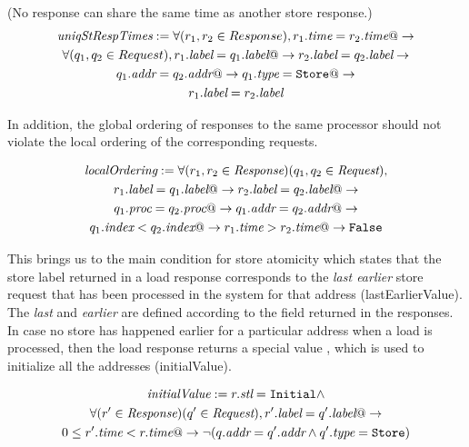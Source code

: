 \begin{defn} (No response can share the same time as another store response.)
\begin{multline*}
\textit{uniqStRespTimes} := 
\forall (r_1, r_2 \in Response), r_1.\textit{time} = r_2.\textit{time} @-> \\
\forall (q_1, q_2 \in Request), r_1.\textit{label} = q_1.\textit{label} @->
r_2.\textit{label} = q_2.\textit{label} -> \\
q_1.\textit{addr} = q_2.\textit{addr} @-> q_1.\textit{type} = \texttt{Store} @-> \\ r_1.\textit{label} = r_2.\textit{label}
\end{multline*}
\end{defn}

In addition, the global ordering of responses to the same processor should not
violate the local ordering of the corresponding requests.
\begin{defn}
\begin{multline*}
\textit{localOrdering} :=
\forall (r_1, r_2 \in \textit{Response}) (q_1, q_2 \in \textit{Request}), \\ r_1.\textit{label}
= q_1.\textit{label} @-> r_2.\textit{label} = q_2.\textit{label} @-> \\ q_1.\textit{proc} = q_2.\textit{proc} @->
q_1.\textit{addr} = q_2.\textit{addr} @-> \\ q_1.\textit{index} < q_2.\textit{index} @-> r_1.\textit{time} > r_2.\textit{time}
  @-> \texttt{False}
\end{multline*}
\end{defn}

This brings us to the main condition for store atomicity which states that the
store label returned in a load response corresponds to the \emph{last earlier}
store request that has been processed in the system for that address (lastEarlierValue). The
\emph{last} and \emph{earlier} are defined according to the field \mytime{}
returned in the responses. In case no store has happened earlier for a
particular address when a load is processed, then the load response returns a
special value \Initial, which is used to initialize all the addresses (initialValue).

\begin{defn}
\begin{multline*}
\textit{initialValue}:= r.\textit{stl} = \texttt{Initial} \wedge \\
\forall (r' \in \textit{Response}) (q' \in \textit{Request}),
r'.\textit{label} = q'.\textit{label} @-> \\ 0 \le r'.\textit{time} < r.\textit{time} @->
\neg (q.\textit{addr} = q'.\textit{addr} \wedge q'.\textit{type} = \texttt{Store})
\end{multline*}
\end{defn}

